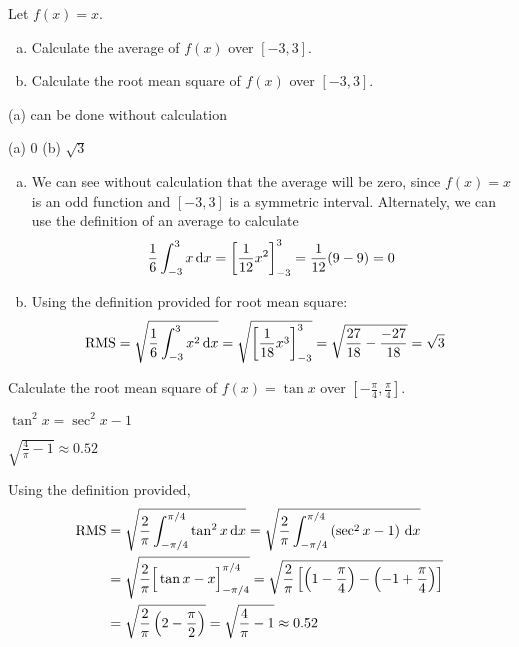 \begin{Mquestion}\label{prob_s2.2:RMS1}
Let $f(x) = x$.
\begin{enumerate}[(a)]
\item Calculate the average of $f(x)$ over $[-3,3]$.
\item Calculate the root mean square of $f(x)$ over $[-3,3]$.
\end{enumerate}
\end{Mquestion}
\begin{hint}
(a) can be done without calculation
\end{hint}
\begin{answer}
(a) 0 \qquad (b) $\sqrt3$
\end{answer}
\begin{solution}
\begin{enumerate}[(a)]
\item We can see without calculation that the average will be zero, since $f(x)=x$ is an odd function and $[-3,3]$ is a symmetric interval. Alternately, we can use the definition of an average to calculate
\[\frac{1}{6}\int_{-3}^3 x\,\mathrm{d}x = \left[\frac{1}{12}x^2\right]_{-3}^3 = \frac{1}{12}(9-9)=0\]
\item Using the definition provided for root mean square:
\begin{align*}
\text{RMS}&=\sqrt{\frac{1}{6}\int_{-3}^3 x^2\,\mathrm{d}x} = \sqrt{\left[\frac{1}{18}x^3\right]_{-3}^3}
= \sqrt{\frac{27}{18}-\frac{-27}{18}} = \sqrt{3}
\end{align*}
\end{enumerate}

\end{solution}

\begin{question}
Calculate the root mean square of $f(x) = \tan x$ over $\left[-\frac{\pi}{4},\frac{\pi}{4}\right]$.
\end{question}
\begin{hint}
$\tan^2 x = \sec^2 x - 1$
\end{hint}
\begin{answer}
$\displaystyle\sqrt{\frac{4}{\pi} - 1}\approx 0.52$
\end{answer}
\begin{solution}
Using the definition provided,
\begin{align*}
\text{RMS}&=\sqrt{\frac{2}{\pi}\int_{-\pi/4}^{\pi/4}\tan^2x\,\mathrm{d}x} = \sqrt{\frac{2}{\pi}\int_{-\pi/4}^{\pi/4}\left(\sec^2x-1\right)\,\mathrm{d}x}\\
&=\sqrt{\frac{2}{\pi}\Big[\tan x - x \Big]_{-\pi/4}^{\pi/4}} =
\sqrt{\frac{2}{\pi}\left[\left(1 - \frac{\pi}{4} \right)-\left(-1 + \frac{\pi}{4} \right)\right]}\\
&=\sqrt{\frac{2}{\pi}\left(2-\frac{\pi}{2}\right)} = \sqrt{\frac{4}{\pi} - 1}
   \approx 0.52
\end{align*}
\end{solution}


